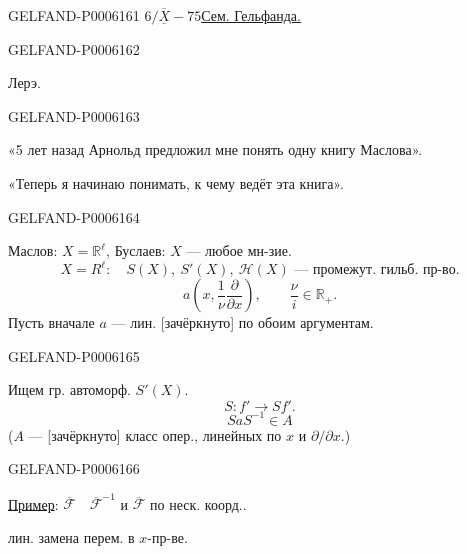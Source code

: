 \begin{GelfandAdjacentEvidence}{GELFAND-P000616}{1}
\underline{\(6/\overline{\underline X}-75\)}\qquad\underline{Сем. Гельфанда.}
\end{GelfandAdjacentEvidence}
\begin{GelfandAdjacentEvidence}{GELFAND-P000616}{2}


Лерэ.
\end{GelfandAdjacentEvidence}
\begin{GelfandAdjacentEvidence}{GELFAND-P000616}{3}

«5 лет назад Арнольд предложил мне понять одну книгу Маслова».

«Теперь я начинаю понимать, к чему ведёт эта книга».
\end{GelfandAdjacentEvidence}
\begin{GelfandAdjacentEvidence}{GELFAND-P000616}{4}




Маслов: \(X=\mathbb R^\ell\), Буслаев: \(X\) — любое мн-зие.
\[
X=R^\ell:\quad S(X),\ S'(X),\ \mathcal H(X)\text{ — промежут. гильб. пр-во.}
\]
\[
a\left(x,\frac1\nu\frac\partial{\partial x}\right),\qquad
\frac\nu i\in\mathbb R_+.
\]
Пусть вначале \(a\) — лин. [зачёркнуто] по обоим аргументам.
\end{GelfandAdjacentEvidence}
\begin{GelfandAdjacentEvidence}{GELFAND-P000616}{5}

Ищем гр. автоморф. \(S'(X)\).
\[
S:f'\longrightarrow Sf'.
\]
\[
SaS^{-1}\in A
\]
(\(A\) — [зачёркнуто] класс опер., линейных по \(x\) и \(\partial/\partial x\).)
\end{GelfandAdjacentEvidence}
\begin{GelfandAdjacentEvidence}{GELFAND-P000616}{6}


\underline{Пример}: \(\overline{\mathcal F}\quad\overline{\mathcal F}^{-1}\)
и \(\overline{\mathcal F}\) по неск. коорд..

лин. замена перем. в \(x\)-пр-ве.
\end{GelfandAdjacentEvidence}
